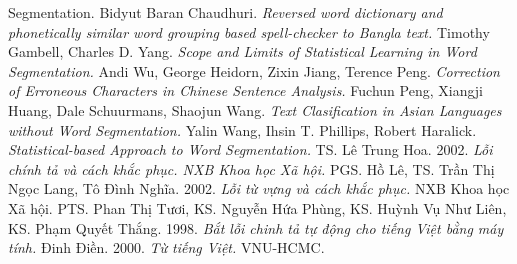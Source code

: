 \documentclass[a4paper,oneside]{book} %
\begin{document}
\begin{thebibliography}{}
{  Segmentation.}%
\bibitem{}Bidyut Baran Chaudhuri. {\em Reversed word dictionary and
  phonetically similar word grouping based spell-checker to Bangla
  text.}%
\bibitem{}Timothy Gambell, Charles D. Yang. {\em Scope and Limits of
  Statistical Learning in Word Segmentation.}%
Andi Wu, George Heidorn, Zixin Jiang, Terence
  Peng. {\em Correction of Erroneous Characters in Chinese Sentence
  Analysis.}%
\bibitem{}Fuchun Peng, Xiangji Huang, Dale Schuurmans, Shaojun
  Wang. {\em Text Clasification in Asian Languages without Word
  Segmentation.}%
\bibitem{}Yalin Wang, Ihsin T. Phillips, Robert
  Haralick. {\em Statistical-based Approach to Word Segmentation.}%
TS. Lê Trung Hoa. 2002. {\em Lỗi chính tả và cách khắc phục. NXB Khoa
  học Xã hội.} 
PGS. Hồ Lê, TS. Trần Thị Ngọc Lang, Tô Đình Nghĩa. 2002. {\em Lỗi từ
  vựng và cách khắc phục.} NXB Khoa học Xã hội.
PTS. Phan Thị Tươi, KS. Nguyễn Hứa Phùng, KS. Huỳnh Vụ
  Như Liên, KS. Phạm Quyết Thắng. 1998. {\em Bắt lỗi chinh tả tự động cho
  tiếng Việt bằng máy tính.}
Đinh Điền. 2000. {\em Từ tiếng Việt.} VNU-HCMC.
\end{thebibliography}
\end{document}
